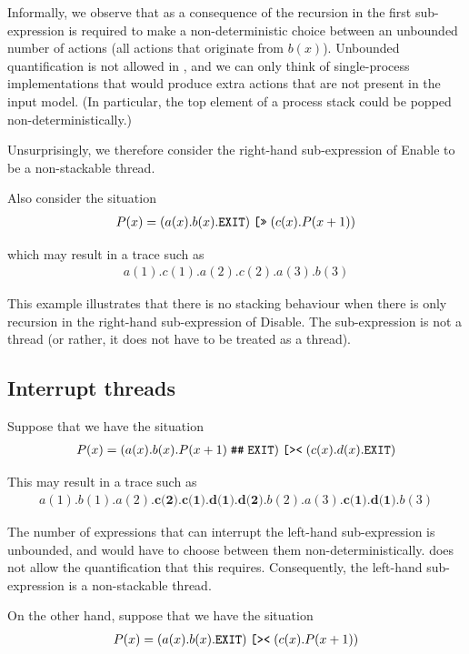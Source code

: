 Informally, we observe that as a consequence of the recursion in the first sub-expression \txs{} is required to make a non-deterministic choice between an unbounded number of actions (all actions that originate from $b(x)$).
Unbounded quantification is not allowed in \txs{}, and we can only think of single-process implementations that would produce extra \istep{} actions that are not present in the input model. (In particular, the top element of a process stack could be popped non-deterministically.)

Unsurprisingly, we therefore consider the right-hand sub-expression of Enable to be a non-stackable thread.

Also consider the situation
\begin{align*}
P(x) = (a(x).b(x).\texttt{EXIT}{})\;\texttt{[>>}\;(c(x).P(x + 1))
\end{align*}

which may result in a trace such as
\begin{align*}
a(1).c(1).a(2).c(2).a(3).b(3)
\end{align*}

This example illustrates that there is no stacking behaviour when there is only recursion in the right-hand sub-expression of Disable.
The sub-expression is not a thread (or rather, it does not have to be treated as a thread).

\subsection{Interrupt threads}

Suppose that we have the situation
\begin{align*}
P(x) = (a(x).b(x).P(x + 1)\;\texttt{\#\#}\;\texttt{EXIT}{})\;\texttt{[><}\;(c(x).d(x).\texttt{EXIT}{})
\end{align*}

This may result in a trace such as
\begin{align*}
a(1).b(1).a(2).\textbf{c(2).c(1).d(1).d(2)}.b(2).a(3).\textbf{c(1).d(1)}.b(3)
\end{align*}

The number of expressions that can interrupt the left-hand sub-expression is unbounded, and \txs{} would have to choose between them non-deterministically.
\txs{} does not allow the quantification that this requires.
Consequently, the left-hand sub-expression is a non-stackable thread.

On the other hand, suppose that we have the situation
\begin{align*}
P(x) = (a(x).b(x).\texttt{EXIT}{})\;\texttt{[><}\;(c(x).P(x + 1))
\end{align*}

